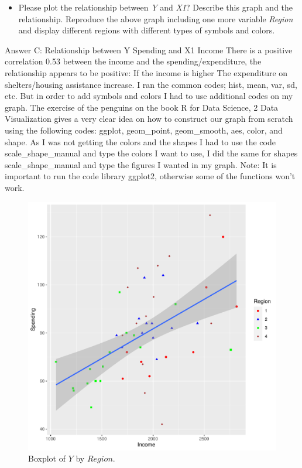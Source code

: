 \documentclass[12pt,letterpaper]{article}
\begin{document}
\begin{itemize}
\item
Please plot the relationship between \emph{Y} and \emph{X1}? Describe this graph and the relationship. Reproduce the above graph including one more variable \emph{Region} and display different regions with different types of symbols and colors.
\end{itemize}


	
	Answer C:
	Relationship between Y Spending and X1 Income
	There is a positive correlation 0.53 between the income and the spending/expenditure, the relationship appears to be positive: If the income is higher The expenditure on shelters/housing assistance increase.
	I ran the common codes; hist, mean, var, sd, etc. But in order to add symbols and colors I had to use additional codes on my graph. The exercise of the penguins on the book R for Data Science, 2 Data Visualization gives a very clear idea on how to construct our graph from scratch using the following codes: ggplot, geom\_point, geom\_smooth, aes, color, and shape.
	As I was not getting the colors and the shapes I had to use the code scale\_shape\_manual and type the colors I want to use, I did the same for shapes scale\_shape\_manual and type the figures I wanted in my graph. 
	Note: It is important to run the code library ggplot2, otherwise some of the functions won't work.
	 

\begin{figure}[h!]\centering
	\caption{\footnotesize Boxplot of $Y$ by $Region$.}\vspace{-1cm}
	\label{fig:plot_3c}
	\includegraphics[width=.75\textwidth]{IMAGEP2_C.pdf}
\end{figure}
\end{document}
